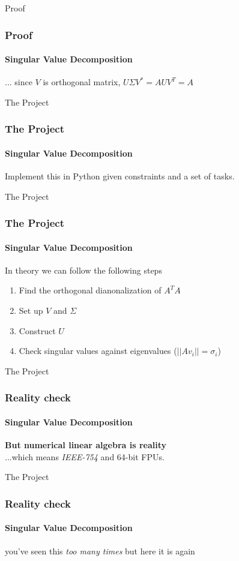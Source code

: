 \documentclass{beamer}
\begin{document}
\begin{frame}{Proof}

\frametitle{Proof}
\framesubtitle{Singular Value Decomposition}

... since $V$ is orthogonal matrix, $U\Sigma V^* = AUV^T = A$

\end{frame}


\begin{frame}{The Project}

\frametitle{The Project}
\framesubtitle{Singular Value Decomposition}

Implement this in Python given constraints and a set of tasks.

\end{frame}


\begin{frame}{The Project}

\frametitle{The Project}
\framesubtitle{Singular Value Decomposition}

In theory we can follow the following steps
\begin{enumerate}
\item Find the orthogonal dianonalization of $A^T A$
\item Set up $V$ and $\Sigma$
\item Construct $U$
\item Check singular values against eigenvalues ($||Av_i|| = \sigma_i $)
\end{enumerate}

\end{frame}


\begin{frame}{The Project}

\frametitle{Reality check}
\framesubtitle{Singular Value Decomposition}

\textbf{But numerical linear algebra is reality}\\...which means \emph{IEEE-754} and
64-bit FPUs.

\end{frame}


\begin{frame}{The Project}

\frametitle{Reality check}
\framesubtitle{Singular Value Decomposition}

you've seen this \emph{too many times} but here it is again

\end{frame}
\end{document}
